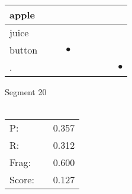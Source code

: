 \documentclass[landscape]{article}
\newcommand{\ssp}{\hspace{2pt}}
\newcommand{\mex}{\cellcolor{g}$\bullet$}
\begin{document}
\begin{tabular}{|l|p{10pt}|p{10pt}|p{10pt}|p{10pt}|p{10pt}|p{10pt}|p{10pt}|p{10pt}|}
\hline
\ssp apple \ssp&\hspace{2pt}&\hspace{2pt}&\hspace{2pt}&\hspace{2pt}&\hspace{2pt}&\hspace{2pt}&\hspace{2pt}&\hspace{2pt}\\
\hline
\ssp juice \ssp&\hspace{2pt}&\hspace{2pt}&\hspace{2pt}&\hspace{2pt}&\hspace{2pt}&\hspace{2pt}&\hspace{2pt}&\hspace{2pt}\\
\hline
\ssp \cellcolor{ref2}button \ssp&\hspace{2pt}&\hspace{2pt}&\hspace{2pt}\mex&\hspace{2pt}&\hspace{2pt}&\hspace{2pt}&\hspace{2pt}&\hspace{2pt}\\
\hline
\ssp \cellcolor{ref7}. \ssp&\hspace{2pt}&\hspace{2pt}&\hspace{2pt}&\hspace{2pt}&\hspace{2pt}&\hspace{2pt}&\hspace{2pt}&\hspace{2pt}\mex\\
\hline
\end{tabular}

\vspace{6pt}
\noindent Segment 20\\\\
\noindent\begin{tabular}{lm{12pt}r}
\hline
P:&&0.357\\
R:&&0.312\\
Frag:&&0.600\\
Score:&&0.127\\
\end{tabular}
\end{document}
